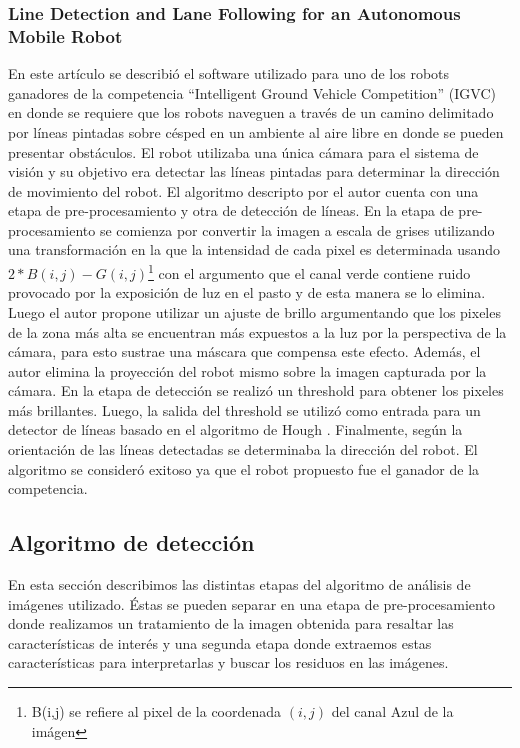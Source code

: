 	\subsubsection{Line Detection and Lane Following for an Autonomous Mobile Robot \cite{Bacha05}}
	En este art\'iculo se describi\'o el software utilizado para uno de los 
	robots ganadores de la competencia ``Intelligent Ground Vehicle 
	Competition'' (IGVC) en donde se requiere que los robots naveguen  a trav\'es de un camino delimitado por l\'ineas pintadas sobre c\'esped en un ambiente al aire libre en donde se pueden presentar obst\'aculos. El robot utilizaba una \'unica c\'amara para el sistema de visi\'on y su objetivo era detectar las l\'ineas pintadas 
para determinar la direcci\'on de movimiento del robot. El algoritmo 
descripto por el autor cuenta con una etapa de pre-procesamiento y otra 
de detecci\'on de l\'ineas. En la etapa de pre-procesamiento se comienza 
por convertir la imagen a escala de grises utilizando una 
transformaci\'on en la que la intensidad de cada pixel es determinada 
usando $2*B(i,j) - G(i,j)$\footnote{B(i,j) se refiere al pixel de la 
coordenada $(i,j)$ del canal Azul de la im\'agen} con el argumento que el canal verde contiene 
ruido provocado por la exposici\'on de luz en el pasto y de esta manera 
se lo elimina. Luego el autor propone utilizar un ajuste de brillo 
argumentando que los pixeles de la zona m\'as alta se encuentran m\'as 
expuestos a la luz por la perspectiva de la c\'amara, para esto sustrae 
una m\'ascara que compensa este efecto. Adem\'as, el autor elimina la 
proyecci\'on del robot mismo sobre la imagen capturada por la c\'amara. 
En la etapa de detecci\'on se realiz\'o un threshold para obtener los 
pixeles m\'as brillantes. Luego, la salida del threshold se utiliz\'o 
como entrada para un detector de l\'ineas basado en el algoritmo de 
Hough \cite{hough62}. Finalmente, seg\'un la orientaci\'on de las l\'ineas 
detectadas se determinaba la direcci\'on del robot. El algoritmo se consider\'o exitoso ya que el robot propuesto fue el ganador de la competencia.

	
\subsection{Algoritmo de detecci\'on}
En esta secci\'on describimos las distintas etapas del algoritmo de an\'alisis 
de im\'agenes utilizado. \'Estas se pueden separar en una etapa de 
pre-procesamiento donde realizamos un tratamiento de la imagen obtenida 
para resaltar las caracter\'isticas de inter\'es y  una segunda etapa 
donde extraemos estas caracter\'isticas para interpretarlas y buscar 
los residuos en las im\'agenes.

